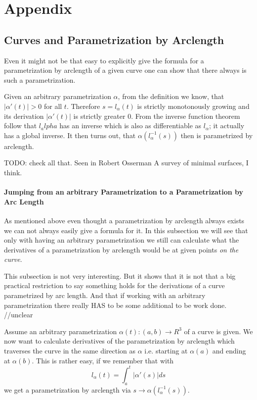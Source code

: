 
\chapter{Appendix}
\section{Curves and Parametrization by Arclength}
 Even it might not be that easy to explicitly give the formula for a parametrization by arclength of a given curve one can show that there always is such a parametrization.

Given an arbitrary parametrization $\alpha$, from the definition we know, that $|\alpha'(t)| > 0$ for all $t$. Therefore $s = l_\alpha(t)$ is strictly monotonously growing and its derivation $|\alpha'(t)|$ is strictly greater 0. From the inverse function theorem follow that $l_alpha$ has an inverse which is also as differentiable as $l_\alpha$; it actually has a global inverse. It then turns out, that $\alpha(l_\alpha^{-1}(s))$ then is parametrized by arclength. 

TODO: check all that. Seen in Robert Osserman A survey of minimal surfaces, I think.

\subsubsection{Jumping from an arbitrary Parametrization to a Parametrization by Arc Length}
As mentioned above even thought a parametrization by arclength always exists we can not always easily give a formula for it. In this subsection we will see that only with having an arbitrary parametrization we still can calculate what the derivatives of a parametrization by arclength would be at given points \emph{on the curve}.
 
This subsection is not very interesting. But it shows that it is not that a big practical restriction to say something holds for the derivations of a curve parametrized by arc length. And that if working with an arbitrary parametrization there really HAS to be some additional to be work done. //unclear

Assume an arbitrary parametrization $\alpha(t): (a,b) \to R^3$ of a curve is given. We now want to calculate derivatives of the parametrization by arclength which traverses the curve in the same direction as $\alpha$ i.e. starting at $\alpha(a)$ and ending at $\alpha(b)$. This is rather easy, if we remember that with 
\[l_\alpha(t) = \int_a^t |\alpha'(s)| ds\]
we get a parametrization by arclength via $s \to \alpha(l_\alpha^{-1}(s))$.
 
